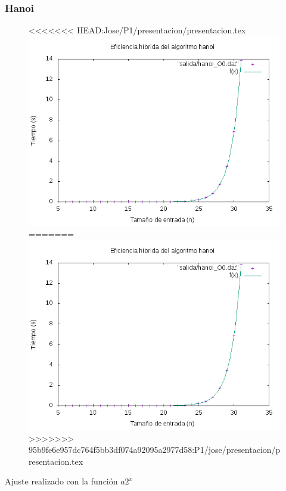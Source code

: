 \documentclass[spanish]{beamer}
\begin{document}
  \begin{frame}\frametitle{Hanoi}
    \begin{figure}[H]
      \centering   
<<<<<<< HEAD:Jose/P1/presentacion/presentacion.tex
      \includegraphics[clip,width=0.7\columnwidth]{../plots/hanoi_O0_fit.png}%
=======
      \includegraphics[clip,width=0.8\columnwidth]{../plots/hanoi_O0_fit.png}%
>>>>>>> 95b9fe6e957dc764f5bb3df074a92095a2977d58:P1/jose/presentacion/presentacion.tex
    \end{figure}

    Ajuste realizado con la función $a2^x$
  \end{frame}
\end{document}

